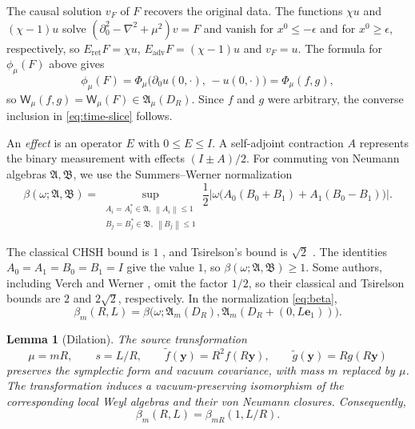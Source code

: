 \documentclass[11pt]{amsart}
\numberwithin{equation}{section}
\newtheorem{lemma}[theorem]{Lemma}
\theoremstyle{definition}
\newcommand{\A}{\mathfrak A}
\newcommand{\B}{\mathfrak B}
\newcommand{\by}{\mathbf y}
\newcommand{\eone}{\mathbf e_1}
\newcommand{\abs}[1]{\left|#1\right|}
\newcommand{\norm}[1]{\left\|#1\right\|}
\newcommand{\wt}[1]{\widetilde{#1}}
\begin{document}
The causal solution \(v_F\) of \(F\) recovers the original data. The functions
\(\chi u\) and \((\chi-1)u\) solve \((\partial_0^2-\nabla^2+\mu^2)v=F\)
and vanish for \(x^0\le-\epsilon\) and for \(x^0\ge\epsilon\),
respectively, so \(E_{\mathrm{ret}}F=\chi u\),
\(E_{\mathrm{adv}}F=(\chi-1)u\) and \(v_F=u\). The formula for
\(\phi_\mu(F)\) above gives
\[
 \phi_\mu(F)
 =\Phi_\mu\bigl(\partial_0u(0,\cdot),\,-u(0,\cdot)\bigr)
 =\Phi_\mu(f,g),
\]
so \(\mathsf W_\mu(f,g)=\mathsf W_\mu(F)\in\A_\mu(D_R)\). Since \(f\) and \(g\) were
arbitrary, the converse inclusion in \eqref{eq:time-slice} follows.

An \emph{effect} is an operator \(E\) with \(0\le E\le I\).
A self-adjoint contraction \(A\) represents the binary measurement with
effects \((I\pm A)/2\). For commuting von Neumann algebras \(\A,\B\), we
use the Summers--Werner normalization
\begin{equation}
 \beta(\omega;\A,\B)
 =
 \sup_{\substack{A_i=A_i^*\in\A,\ \norm{A_i}\le1\\
                 B_j=B_j^*\in\B,\ \norm{B_j}\le1}}
 \frac12\abs{\omega\bigl(A_0(B_0+B_1)+A_1(B_0-B_1)\bigr)}.
 \label{eq:beta}
\end{equation}

The classical CHSH bound is \(1\) \cite{CHSH69,SW87a}, and Tsirelson's
bound is \(\sqrt2\) \cite{Tsirelson80}. The identities \(A_0=A_1=B_0=B_1=I\) give the value \(1\), so
\(\beta(\omega;\A,\B)\ge1\).
Some authors, including Verch and Werner \cite{VW05}, omit the factor
\(1/2\), so their classical and Tsirelson bounds are \(2\) and
\(2\sqrt2\), respectively. In the normalization \eqref{eq:beta},
\[
 \beta_m(R,L)=
 \beta\bigl(\omega;\A_m(D_R),\A_m(D_R+(0,L\eone))\bigr).
\]

\begin{lemma}[Dilation]\label{lem:scaling}
The source transformation
\begin{equation}
 \mu=mR,\qquad s=L/R,\qquad
 \wt f(\by)=R^2f(R\by),\qquad
 \wt g(\by)=Rg(R\by)
 \label{eq:scaling}
\end{equation}
preserves the symplectic form and vacuum covariance, with mass \(m\)
replaced by \(\mu\). The transformation induces a vacuum-preserving isomorphism of the
corresponding local Weyl algebras and their von Neumann closures.
Consequently,
\[
 \beta_m(R,L)=\beta_{mR}(1,L/R).
\]
\end{lemma}
\end{document}

